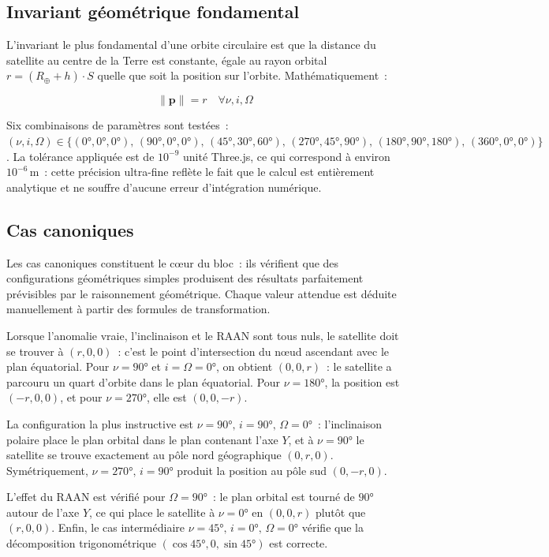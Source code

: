 \documentclass[12pt,a4paper]{article}
\begin{document}
\subsection{Invariant géométrique fondamental}

L'invariant le plus fondamental d'une orbite circulaire est que la distance du satellite au centre de la Terre est constante, égale au rayon orbital $r = (R_\oplus + h) \cdot S$ quelle que soit la position sur l'orbite. Mathématiquement~:

\begin{equation}
    \|\mathbf{p}\| = r \quad \forall \nu, i, \Omega
\end{equation}

Six combinaisons de paramètres sont testées~: $(\nu, i, \Omega) \in \{(0°,0°,0°),\,(90°,0°,0°),\,(45°,30°,60°),\,(270°,45°,90°),\,(180°,90°,180°),\,(360°,0°,0°)\}$. La tolérance appliquée est de $10^{-9}$ unité Three.js, ce qui correspond à environ $10^{-6}\,\text{m}$~: cette précision ultra-fine reflète le fait que le calcul est entièrement analytique et ne souffre d'aucune erreur d'intégration numérique.

\subsection{Cas canoniques}

Les cas canoniques constituent le cœur du bloc~: ils vérifient que des configurations géométriques simples produisent des résultats parfaitement prévisibles par le raisonnement géométrique. Chaque valeur attendue est déduite manuellement à partir des formules de transformation.

Lorsque l'anomalie vraie, l'inclinaison et le RAAN sont tous nuls, le satellite doit se trouver à $(r, 0, 0)$~: c'est le point d'intersection du nœud ascendant avec le plan équatorial. Pour $\nu = 90°$ et $i = \Omega = 0°$, on obtient $(0, 0, r)$~: le satellite a parcouru un quart d'orbite dans le plan équatorial. Pour $\nu = 180°$, la position est $(-r, 0, 0)$, et pour $\nu = 270°$, elle est $(0, 0, -r)$.

La configuration la plus instructive est $\nu = 90°,\, i = 90°,\, \Omega = 0°$~: l'inclinaison polaire place le plan orbital dans le plan contenant l'axe $Y$, et à $\nu = 90°$ le satellite se trouve exactement au pôle nord géographique $(0, r, 0)$. Symétriquement, $\nu = 270°,\, i = 90°$ produit la position au pôle sud $(0, -r, 0)$.

L'effet du RAAN est vérifié pour $\Omega = 90°$~: le plan orbital est tourné de $90°$ autour de l'axe $Y$, ce qui place le satellite à $\nu = 0°$ en $(0, 0, r)$ plutôt que $(r, 0, 0)$. Enfin, le cas intermédiaire $\nu = 45°,\, i = 0°,\, \Omega = 0°$ vérifie que la décomposition trigonométrique $(\cos 45°, 0, \sin 45°)$ est correcte.
\end{document}
